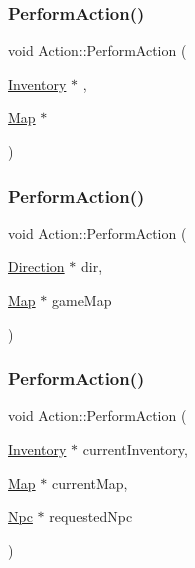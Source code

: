 \mbox{\label{class_action_a82c8a777b8e70158c30da970b36dff65}} 
\subsubsection{\texorpdfstring{Perform\+Action()}{PerformAction()}\hspace{0.1cm}{\footnotesize\ttfamily [5/7]}}
{\footnotesize\ttfamily void Action\+::\+Perform\+Action (\begin{DoxyParamCaption}\item[{\mbox{\hyperlink{class_inventory}{Inventory}} $\ast$}]{,  }\item[{\mbox{\hyperlink{class_map}{Map}} $\ast$}]{ }\end{DoxyParamCaption})\hspace{0.3cm}{\ttfamily [virtual]}}

\mbox{\label{class_action_a0dd798bc02051ef21e911b0ed7d04d00}} 
\subsubsection{\texorpdfstring{Perform\+Action()}{PerformAction()}\hspace{0.1cm}{\footnotesize\ttfamily [6/7]}}
{\footnotesize\ttfamily void Action\+::\+Perform\+Action (\begin{DoxyParamCaption}\item[{\mbox{\hyperlink{class_direction}{Direction}} $\ast$}]{dir,  }\item[{\mbox{\hyperlink{class_map}{Map}} $\ast$}]{game\+Map }\end{DoxyParamCaption})\hspace{0.3cm}{\ttfamily [virtual]}}

\mbox{\label{class_action_a35d4aeec1e36a3889d9d7870a7ab868a}} 
\subsubsection{\texorpdfstring{Perform\+Action()}{PerformAction()}\hspace{0.1cm}{\footnotesize\ttfamily [7/7]}}
{\footnotesize\ttfamily void Action\+::\+Perform\+Action (\begin{DoxyParamCaption}\item[{\mbox{\hyperlink{class_inventory}{Inventory}} $\ast$}]{current\+Inventory,  }\item[{\mbox{\hyperlink{class_map}{Map}} $\ast$}]{current\+Map,  }\item[{\mbox{\hyperlink{class_npc}{Npc}} $\ast$}]{requested\+Npc }\end{DoxyParamCaption})\hspace{0.3cm}{\ttfamily [virtual]}}



